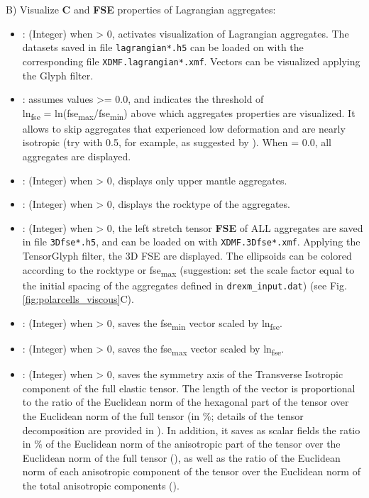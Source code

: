 B) Visualize \textbf{C} and \textbf{FSE} properties of Lagrangian aggregates:
\begin{itemize}
    
    \item {}: (Integer) when > 0, activates visualization of Lagrangian aggregates. The datasets saved in file \texttt{lagrangian*.h5} can be loaded on \paraviewtitle{} with the corresponding file \texttt{XDMF.lagrangian*.xmf}. Vectors can be visualized applying the Glyph filter.
	
	\item {}: assumes values >= 0.0, and indicates the threshold of\\ ln\textsubscript{fse} = ln(fse\textsubscript{max}/fse\textsubscript{min}) above which aggregates properties are visualized. It allows to skip aggregates that experienced low deformation and are nearly isotropic (try with 0.5, for example, as suggested by \citet{becker2006epsl}). When  = 0.0, all aggregates are displayed.
	
	\item {}: (Integer) when > 0, displays only upper mantle aggregates.
	
	\item {}: (Integer) when > 0, displays the rocktype of the aggregates.
	
	\item {}\footnotemark: (Integer) when > 0, the left stretch tensor \textbf{FSE} of ALL aggregates are saved in file \texttt{3Dfse*.h5}, and can be loaded on \paraviewtitle{} with \texttt{XDMF.3Dfse*.xmf}. Applying the TensorGlyph filter, the 3D FSE are displayed. The ellipsoids can be colored according to the rocktype or fse\textsubscript{max} (suggestion: set the scale factor equal to the initial spacing of the aggregates defined in \texttt{drexm\_input.dat}) (see Fig. \ref{fig:polarcells_viscous}C).
	
	\item {}: (Integer) when > 0, saves the fse\textsubscript{min} vector scaled by ln\textsubscript{fse}.
	
	\item {}: (Integer) when > 0, saves the fse\textsubscript{max} vector scaled by ln\textsubscript{fse}.
	
	\item {}: (Integer) when > 0, saves the symmetry axis of the Transverse Isotropic component of the full elastic tensor. The length of the vector is proportional to the ratio of the Euclidean norm of the hexagonal part of the tensor over the Euclidean norm of the full tensor (in \%; details of the tensor decomposition are provided in \citet{browaeys2004gji}). In addition, it saves as scalar fields the ratio in \% of the Euclidean norm of the anisotropic part of the tensor over the Euclidean norm of the full tensor (), as well as the ratio of the Euclidean norm of each anisotropic component of the tensor over the Euclidean norm of the total anisotropic components (). 
	

\end{itemize}
